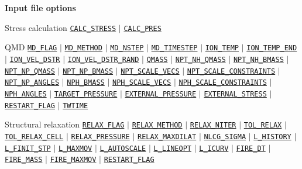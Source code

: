 \begin{frame}[allowframebreaks]{\textbf{Input file options}}
  \vspace{-2mm}
  \begin{block}{Stress calculation}
  \hyperlink{CALC_STRESS}{\texttt{CALC\_STRESS}} $\vert$
  \hyperlink{CALC_PRES}{\texttt{CALC\_PRES}}
  \end{block}
  \vspace{-2mm}
  
  \begin{block}{QMD}
  \hyperlink{MD_FLAG}{\texttt{MD\_FLAG}} $\vert$
  \hyperlink{MD_METHOD}{\texttt{MD\_METHOD}} $\vert$
  \hyperlink{MD_NSTEP}{\texttt{MD\_NSTEP}} $\vert$
  \hyperlink{MD_TIMESTEP}{\texttt{MD\_TIMESTEP}} $\vert$
  \hyperlink{ION_TEMP}{\texttt{ION\_TEMP}} $\vert$
  \hyperlink{ION_TEMP_END}{\texttt{ION\_TEMP\_END}} $\vert$
  \hyperlink{ION_VEL_DSTR}{\texttt{ION\_VEL\_DSTR}} $\vert$
  \hyperlink{ION_VEL_DSTR_RAND}{\texttt{ION\_VEL\_DSTR\_RAND}} $\vert$
  \hyperlink{QMASS}{\texttt{QMASS}} $\vert$
  \hyperlink{NPT_NH_QMASS}{\texttt{NPT\_NH\_QMASS}} $\vert$
  \hyperlink{NPT_NH_BMASS}{\texttt{NPT\_NH\_BMASS}} $\vert$
  \hyperlink{NPT_NP_QMASS}{\texttt{NPT\_NP\_QMASS}} $\vert$
  \hyperlink{NPT_NP_BMASS}{\texttt{NPT\_NP\_BMASS}} $\vert$
  \hyperlink{NPT_SCALE_VECS}{\texttt{NPT\_SCALE\_VECS}} $\vert$
  \hyperlink{NPT_SCALE_CONSTRAINTS}{\texttt{NPT\_SCALE\_CONSTRAINTS}} $\vert$ 
  \hyperlink{NPT_NP_ANGLES}{\texttt{NPT\_NP\_ANGLES}} $\vert$ 
  \hyperlink{NPH_BMASS}{\texttt{NPH\_BMASS}} $\vert$
  \hyperlink{NPH_SCALE_VECS}{\texttt{NPH\_SCALE\_VECS}} $\vert$
  \hyperlink{NPH_SCALE_CONSTRAINTS}{\texttt{NPH\_SCALE\_CONSTRAINTS}} $\vert$ 
  \hyperlink{NPH_ANGLES}{\texttt{NPH\_ANGLES}} $\vert$ 
  \hyperlink{TARGET_PRESSURE}{\texttt{TARGET\_PRESSURE}} $\vert$
  \hyperlink{EXTERNAL_PRESSURE}{\texttt{EXTERNAL\_PRESSURE}} $\vert$
  \hyperlink{EXTERNAL_STRESS}{\texttt{EXTERNAL\_STRESS}} $\vert$
  \hyperlink{RESTART_FLAG}{\texttt{RESTART\_FLAG}} $\vert$
  \hyperlink{TWTIME}{\texttt{TWTIME}}
  \end{block}
  
  \vspace{-2mm}
  \begin{block}{Structural relaxation}
  \hyperlink{RELAX_FLAG}{\texttt{RELAX\_FLAG}} $\vert$
  \hyperlink{RELAX_METHOD}{\texttt{RELAX\_METHOD}} $\vert$
  \hyperlink{RELAX_NITER}{\texttt{RELAX\_NITER}} $\vert$
  \hyperlink{TOL_RELAX}{\texttt{TOL\_RELAX}} $\vert$
  \hyperlink{TOL_RELAX_CELL}{\texttt{TOL\_RELAX\_CELL}} $\vert$ \hyperlink{RELAX_PRESSURE}{\texttt{RELAX\_PRESSURE}} $\vert$
  \hyperlink{RELAX_MAXDILAT}{\texttt{RELAX\_MAXDILAT}} $\vert$
  \hyperlink{NLCG_SIGMA}{\texttt{NLCG\_SIGMA}} $\vert$
  \hyperlink{L_HISTORY}{\texttt{L\_HISTORY}} $\vert$
  \hyperlink{L_FINIT_STP}{\texttt{L\_FINIT\_STP}} $\vert$
  \hyperlink{L_MAXMOV}{\texttt{L\_MAXMOV}} $\vert$
  \hyperlink{L_AUTOSCALE}{\texttt{L\_AUTOSCALE}} $\vert$
  \hyperlink{L_LINEOPT}{\texttt{L\_LINEOPT}} $\vert$
  \hyperlink{L_ICURV}{\texttt{L\_ICURV}} $\vert$
  \hyperlink{FIRE_DT}{\texttt{FIRE\_DT}} $\vert$
  \hyperlink{FIRE_MASS}{\texttt{FIRE\_MASS}} $\vert$
  \hyperlink{FIRE_MAXMOV}{\texttt{FIRE\_MAXMOV}} $\vert$
  \hyperlink{RESTART_FLAG}{\texttt{RESTART\_FLAG}}
  \end{block}


\end{frame}
